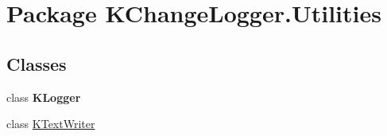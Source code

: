 \hypertarget{namespace_k_change_logger_1_1_utilities}{\section{Package K\-Change\-Logger.\-Utilities}
\label{namespace_k_change_logger_1_1_utilities}
}
\subsection*{Classes}
\begin{DoxyCompactItemize}
\item 
class {\bfseries K\-Logger}
\item 
class \hyperlink{class_k_change_logger_1_1_utilities_1_1_k_text_writer}{K\-Text\-Writer}
\end{DoxyCompactItemize}
